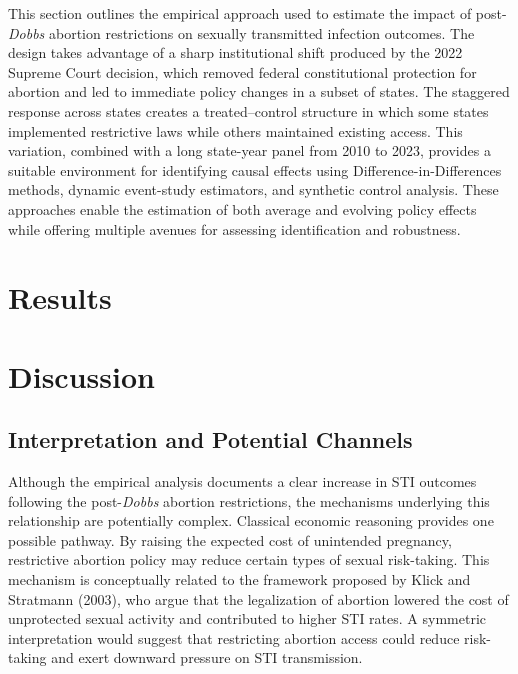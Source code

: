 \documentclass{article}
\begin{document}
This section outlines the empirical approach used to estimate the impact of post-\textit{Dobbs} abortion restrictions on sexually transmitted infection outcomes. The design takes advantage of a sharp institutional shift produced by the 2022 Supreme Court decision, which removed federal constitutional protection for abortion and led to immediate policy changes in a subset of states. The staggered response across states creates a treated–control structure in which some states implemented restrictive laws while others maintained existing access. This variation, combined with a long state-year panel from 2010 to 2023, provides a suitable environment for identifying causal effects using Difference-in-Differences methods, dynamic event-study estimators, and synthetic control analysis. These approaches enable the estimation of both average and evolving policy effects while offering multiple avenues for assessing identification and robustness. 



\section{Results}\label{sec:results}



\section{Discussion}\label{sec:discussion}

\subsection{Interpretation and Potential Channels}

Although the empirical analysis documents a clear increase in STI outcomes following the post-\textit{Dobbs} abortion restrictions, the mechanisms underlying this relationship are potentially complex. Classical economic reasoning provides one possible pathway. By raising the expected cost of unintended pregnancy, restrictive abortion policy may reduce certain types of sexual risk-taking. This mechanism is conceptually related to the framework proposed by Klick and Stratmann (2003), who argue that the legalization of abortion lowered the cost of unprotected sexual activity and contributed to higher STI rates. A symmetric interpretation would suggest that restricting abortion access could reduce risk-taking and exert downward pressure on STI transmission.
\end{document}
